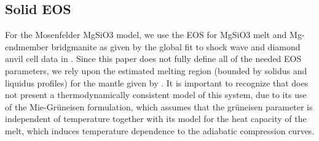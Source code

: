 \subsection{Solid EOS}
For the Mosenfelder MgSiO3 model, we use the EOS for MgSiO3 melt and Mg-endmember bridgmanite as given by the global fit to shock wave and diamond anvil cell data in \cite{M09}.  Since this paper does not fully define all of the needed EOS parameters, we rely upon the estimated melting region (bounded by solidus and liquidus profiles) for the mantle given by \cite{SKS09}.  It is important to recognize that \cite{M09} does not present a thermodynamically consistent model of this system, due to its  use of the Mie-Gr\"{u}neisen formulation, which assumes that the gr\"{u}neisen parameter is independent of temperature together with its model for the heat capacity of the melt, which induces temperature dependence to the adiabatic compression curves.

